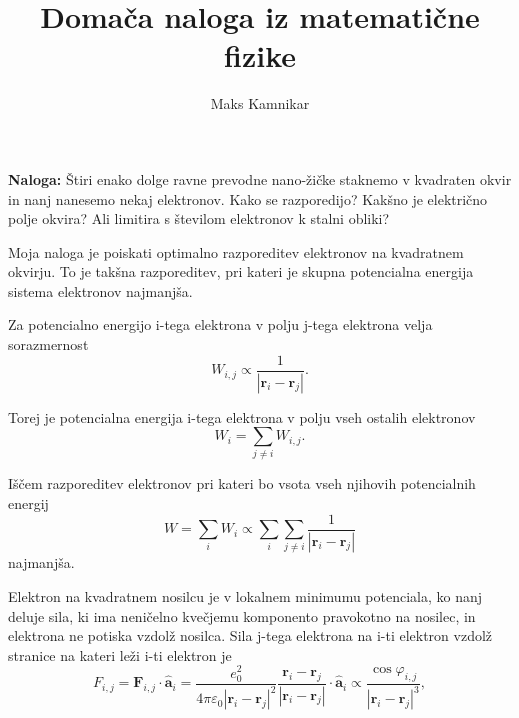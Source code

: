 \documentclass[a4paper,11pt]{article}
\title{Doma\v ca naloga iz matemati\v cne fizike}
\author{Maks Kamnikar}
\begin{document}
    \maketitle

    \textbf{Naloga:}
    \newline
    \v Stiri enako dolge ravne prevodne nano-\v zi\v cke staknemo v kvadraten okvir in nanj
    nanesemo nekaj elektronov.
    \newline
    Kako se razporedijo?
    \newline
    Kak\v sno je elektri\v cno polje okvira?
    \newline
    Ali limitira s \v stevilom elektronov k stalni obliki?


    \vspace{30pt}
    Moja naloga je poiskati optimalno razporeditev elektronov na kvadratnem okvirju.
    To je tak\v sna razporeditev, pri kateri je skupna potencialna energija sistema elektronov
    najmanj\v sa.

    \vspace{30pt}
    Za potencialno energijo i-tega elektrona v polju j-tega elektrona velja sorazmernost
    $$ W_{i,j} \propto \frac{1}{\left\vert\mathbf{r}_{i} - \mathbf{r}_{j}\right\vert}. $$

    \noindent
    Torej je potencialna energija i-tega elektrona v polju vseh ostalih elektronov
    $$ W_{i} = \sum_{j \neq i} W_{i,j}. $$

    \noindent
    I\v s\v cem razporeditev elektronov pri kateri bo vsota vseh njihovih potencialnih energij
    $$ W = \sum_{i} W_{i} \propto \sum_{i} \sum_{j \neq i} \frac{1}{\left\vert\mathbf{r}_{i} - \mathbf{r}_{j}\right\vert} $$
    najmanj\v sa.

    \vspace{10pt}
    Elektron na kvadratnem nosilcu je v lokalnem minimumu potenciala, ko nanj deluje sila,
    ki ima neni\v celno kve\v cjemu komponento pravokotno na nosilec, in elektrona ne potiska
    vzdol\v z nosilca.
    Sila j-tega elektrona na i-ti elektron vzdol\v z stranice na kateri le\v zi i-ti elektron je
    $$ F_{i,j} =\mathbf{F}_{i,j} \cdot \hat{\mathbf{a}}_i= \frac{e_{0} ^ 2}{4 \pi \varepsilon_{0} \left\vert \mathbf{r}_{i} -
    \mathbf{r}_{j} \right\vert ^2}
    \frac{\mathbf{r}_{i} - \mathbf{r}_{j}}{\left\vert \mathbf{r}_{i} - \mathbf{r}_{j} \right\vert} \cdot \hat{\mathbf{a}}_i
    \propto \frac{\cos \varphi_{i,j}}{\left\vert \mathbf{r}_{i} -
    \mathbf{r}_{j} \right\vert^3} , $$
\end{document}
